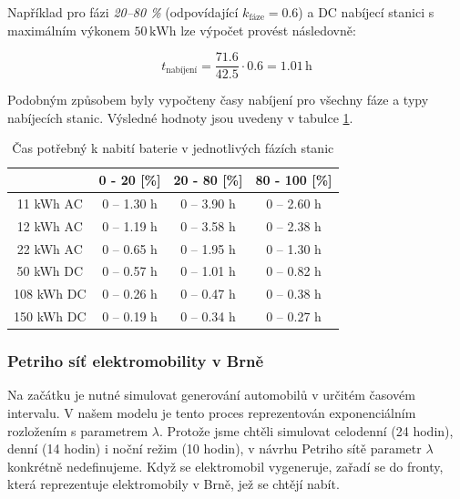 \documentclass[a4paper,11pt]{article}
\begin{document}
Například pro fázi \textit{20–80 \%} (odpovídající \(k_{\text{fáze}} = 0.6\)) a DC nabíjecí stanici s maximálním výkonem \(50 \, \mathrm{kWh}\) lze výpočet provést následovně:

\[
t_{\text{nabíjení}} = \frac{71.6}{42.5} \cdot 0.6 = 1.01 \, \mathrm{h}
\]

Podobným způsobem byly vypočteny časy nabíjení pro všechny fáze a typy nabíjecích stanic. Výsledné hodnoty jsou uvedeny v tabulce \ref{table:charging-time-consumption}.


\begin{table}[H]
    \centering 
    \vspace{0.5cm} %
    \begin{tabular}{|c|c|c|c|}
        \hline
        \textbf{} & \textbf{0 - 20 [\%]} & \textbf{20 - 80 [\%]} & \textbf{80 - 100 [\%]}\\
        \hline
        11 kWh AC  &  0 -- 1.30 h  & 0 -- 3.90 h & 0 -- 2.60 h  \\
        \hline
        12 kWh AC  &  0 -- 1.19 h  & 0 -- 3.58 h & 0 -- 2.38 h  \\
        \hline
        22 kWh AC  &  0 -- 0.65 h  & 0 -- 1.95 h & 0 -- 1.30 h  \\
        \hline
        50 kWh DC  &  0 -- 0.57 h & 0 -- 1.01 h & 0 -- 0.82 h  \\
        \hline
        108 kWh DC &  0 -- 0.26 h  & 0 -- 0.47 h & 0 -- 0.38 h  \\
        \hline
        150 kWh DC &  0 -- 0.19 h  & 0 -- 0.34 h & 0 -- 0.27 h  \\
        \hline
    \end{tabular}
    \caption{Čas potřebný k nabití baterie v jednotlivých fázích stanic}
    \label{table:charging-time-consumption}
    \vspace{0.5cm} %
\end{table}


\subsubsection{Petriho síť elektromobility v Brně}

Na začátku je nutné simulovat generování automobilů v určitém časovém intervalu. V našem modelu je tento proces reprezentován exponenciálním rozložením s parametrem \(\lambda\). Protože jsme chtěli simulovat celodenní (24 hodin), denní (14 hodin) i noční režim (10 hodin), v návrhu Petriho sítě parametr \(\lambda\) konkrétně nedefinujeme. Když se elektromobil vygeneruje, zařadí se do fronty, která reprezentuje elektromobily v Brně, jež se chtějí nabít. 
\end{document}
